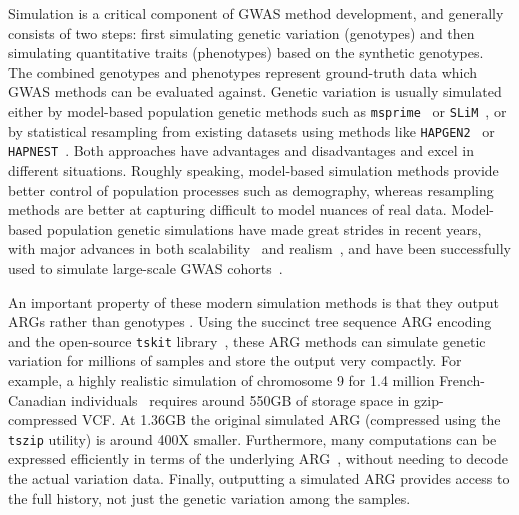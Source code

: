 \documentclass[unnumsec,webpdf,modern,large,namedate]{oup-authoring-template}%
\begin{document}
Simulation is a critical component of GWAS method development, and
generally consists of two steps:
first simulating genetic variation (genotypes)
and then simulating quantitative traits (phenotypes) based on the
synthetic genotypes.
The combined genotypes and phenotypes represent ground-truth data
which GWAS methods can be evaluated against.
Genetic variation is
usually simulated either by model-based population genetic
methods such as
\texttt{msprime}~\citep{baumdicker2022efficient}
or \texttt{SLiM}~\citep{haller2023},
or by statistical resampling from existing datasets
using methods like \texttt{HAPGEN2}~\citep{su2011hapgen2}
or \texttt{HAPNEST}~\citep{wharrie2023hapnest}.
Both approaches have advantages and disadvantages and excel
in different situations.
Roughly speaking, model-based simulation methods
provide better control of population processes such as demography,
whereas resampling methods are better at capturing
difficult to model nuances of real data.
Model-based population genetic simulations have made
great strides in recent years, with major advances in both
scalability~\citep{kelleher2016efficient,kelleher2018efficient,haller2018tree}
and realism~\citep{adrion2020,anderson2023}, and
have been successfully used to simulate large-scale GWAS
cohorts~\cite[e.g.][]{martin2017,zaidi2020}.

An important property of these modern simulation methods is that
they output ARGs rather than genotypes \citep[e.g.\ as VCF,][]{danecek2011}.
Using the succinct tree sequence ARG encoding~\citep{wong2023general}
and the open-source \texttt{tskit} library~\citep{ralph2020},
these ARG methods can simulate genetic variation for millions of
samples and store the output very compactly.
For example, a highly realistic simulation
of chromosome 9 for 1.4 million
French-Canadian individuals~\citep{anderson2023}
requires around 550GB of storage space in gzip-compressed VCF.
At 1.36GB the original simulated ARG
(compressed using the \texttt{tszip} utility) is around 400X smaller.
Furthermore, many computations can
be expressed efficiently in terms of the underlying
ARG~\citep{kelleher2016efficient,ralph2020}, without
needing to decode the actual variation data.
Finally, outputting a simulated ARG provides access to the full
history, not just the genetic variation among the samples.
\end{document}
